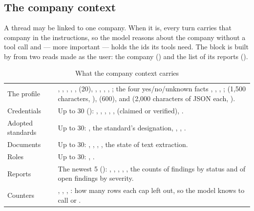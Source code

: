 \subsection{The company context}\label{sec:chat:company}

A thread may be linked to one company. When it is, every turn carries that company in the
instructions, so the model reasons about the company without a tool call and --- more
important --- holds the ids its tools need. The block is built by  from two
reads made as the user: the company () and the list of its
reports ().

\begin{table}[H]
\caption{What the company context carries}\label{tab:chat:company}
\begin{tabularx}{\textwidth}{@{}L{33mm}Y@{}}
\toprule
{} &  \\
\midrule
The profile & , , , , ,  (20), , , , , ; the four yes/no/unknown facts , , , ;  (1,500 characters, ),  (600),  and  (2,000 characters of JSON each, ). \\
Credentials & Up to 30 (): , , , , ,  (claimed or verified), . \\
Adopted standards & Up to 30: , the standard's designation, , , . \\
Documents & Up to 30: , , , , the state of text extraction. \\
Roles & Up to 30: , . \\
Reports & The newest 5 (): , , , , , the counts of findings by status and of open findings by severity. \\
Counters & , , , : how many rows each cap left out, so the model knows to call  or . \\
\bottomrule
\end{tabularx}
\end{table}

